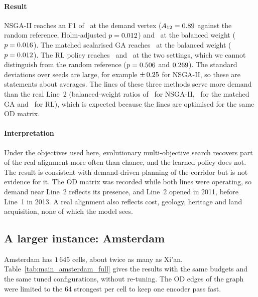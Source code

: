 \paragraph{Result} NSGA-II reaches an F1 of \HoldoutNSGAVertexFOne\ at the demand vertex ($A_{12}=0.89$ against the random reference, Holm-adjusted $p=0.012$) and \HoldoutNSGABalancedFOne\ at the balanced weight ($p=0.016$). The matched scalarised GA reaches \HoldoutGAMatchedBalancedFOne\ at the balanced weight ($p=0.012$). The RL policy reaches \HoldoutRLVertexFOne\ and \HoldoutRLBalancedFOne\ at the two settings, which we cannot distinguish from the random reference ($p=0.506$ and $0.269$). The standard deviations over seeds are large, for example $\pm\,0.25$ for NSGA-II, so these are statements about averages. The lines of these three methods serve more demand than the real Line~2 (balanced-weight ratios of \HoldoutNSGABalancedRatio\ for NSGA-II, \HoldoutGAMatchedBalancedRatio\ for the matched GA and \HoldoutRLBalancedRatio\ for RL), which is expected because the lines are optimised for the same OD matrix.

\paragraph{Interpretation} Under the objectives used here, evolutionary multi-objective search recovers part of the real alignment more often than chance, and the learned policy does not. The result is consistent with demand-driven planning of the corridor but is not evidence for it. The OD matrix was recorded while both lines were operating, so demand near Line~2 reflects its presence, and Line~2 opened in 2011, before Line~1 in 2013. A real alignment also reflects cost, geology, heritage and land acquisition, none of which the model sees.

\subsection{A larger instance: Amsterdam}\label{sec:res-amsterdam}
Amsterdam has $1\,645$ cells, about twice as many as Xi'an. Table~\ref{tab:main_amsterdam_full} gives the results with the same budgets and the same tuned configurations, without re-tuning. The OD edges of the graph were limited to the 64 strongest per cell to keep one encoder pass fast.

